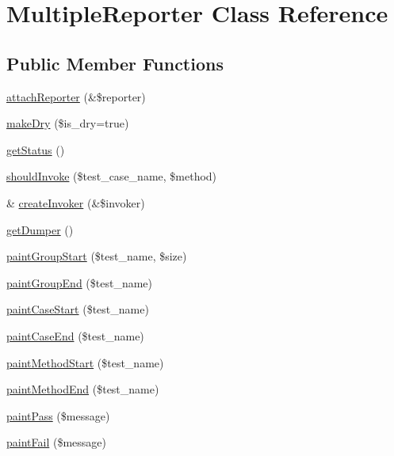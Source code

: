 \hypertarget{class_multiple_reporter}{
\section{MultipleReporter Class Reference}
\label{class_multiple_reporter}
}
\subsection*{Public Member Functions}
\begin{DoxyCompactItemize}
\item 
\hyperlink{class_multiple_reporter_ad3b169ee8f199123620cb05f6e31051e}{attachReporter} (\&\$reporter)
\item 
\hyperlink{class_multiple_reporter_a66eeb60bbe27eaceb0447a9c20337414}{makeDry} (\$is\_\-dry=true)
\item 
\hyperlink{class_multiple_reporter_ad690d4e9c2b2183feb0e93a6b4cac406}{getStatus} ()
\item 
\hyperlink{class_multiple_reporter_adc99084bc0502e8cd8a42837e1f63aba}{shouldInvoke} (\$test\_\-case\_\-name, \$method)
\item 
\& \hyperlink{class_multiple_reporter_a8b5c73bd1dd2139b95d1c8a50e760068}{createInvoker} (\&\$invoker)
\item 
\hyperlink{class_multiple_reporter_ae0a4ebf1c103d8b65b32245a828f7256}{getDumper} ()
\item 
\hyperlink{class_multiple_reporter_a124c97c84dc679cc6ad14aa2012bb444}{paintGroupStart} (\$test\_\-name, \$size)
\item 
\hyperlink{class_multiple_reporter_a46f66fdc2d08ab56480df66374523e22}{paintGroupEnd} (\$test\_\-name)
\item 
\hyperlink{class_multiple_reporter_af4b1f80776530199cd91419c758c3d68}{paintCaseStart} (\$test\_\-name)
\item 
\hyperlink{class_multiple_reporter_a8affb95d16ee73a0fd2f9ff7a0b16b32}{paintCaseEnd} (\$test\_\-name)
\item 
\hyperlink{class_multiple_reporter_adf97d0d391f684bffccebc70d4b1c6be}{paintMethodStart} (\$test\_\-name)
\item 
\hyperlink{class_multiple_reporter_aa38b4e0798db871b957384656377cd33}{paintMethodEnd} (\$test\_\-name)
\item 
\hyperlink{class_multiple_reporter_af5d2815cc7b6ac663c73c059868b2345}{paintPass} (\$message)
\item 
\hyperlink{class_multiple_reporter_adbf0d817ea66a3ed6ecbfaa12da81b55}{paintFail} (\$message)

\end{DoxyCompactItemize}
